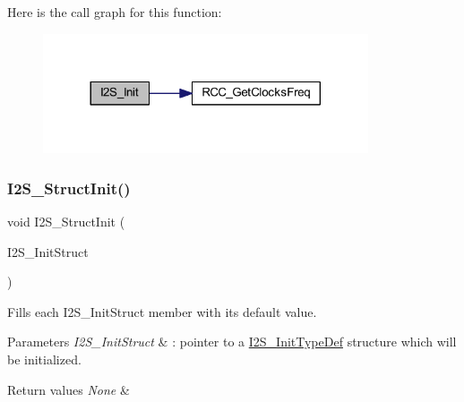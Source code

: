 Here is the call graph for this function\+:
\nopagebreak
\begin{figure}[H]
\begin{center}
\leavevmode
\includegraphics[width=272pt]{group___s_p_i___private___functions_ga53661884ae4a9640df7cbc59187782f7_cgraph}
\end{center}
\end{figure}
\mbox{\label{group___s_p_i___private___functions_ga7470ec1d0759fdeeb42c7fe71a3b41b7}} 
\subsubsection{\texorpdfstring{I2\+S\+\_\+\+Struct\+Init()}{I2S\_StructInit()}}
{\footnotesize\ttfamily void I2\+S\+\_\+\+Struct\+Init (\begin{DoxyParamCaption}\item[{\hyperlink{struct_i2_s___init_type_def}{I2\+S\+\_\+\+Init\+Type\+Def} $\ast$}]{I2\+S\+\_\+\+Init\+Struct }\end{DoxyParamCaption})}



Fills each I2\+S\+\_\+\+Init\+Struct member with its default value. 


\begin{DoxyParams}{Parameters}
{\em I2\+S\+\_\+\+Init\+Struct} & \+: pointer to a \hyperlink{struct_i2_s___init_type_def}{I2\+S\+\_\+\+Init\+Type\+Def} structure which will be initialized. \\
\hline
\end{DoxyParams}

\begin{DoxyRetVals}{Return values}
{\em None} & \\
\hline
\end{DoxyRetVals}



